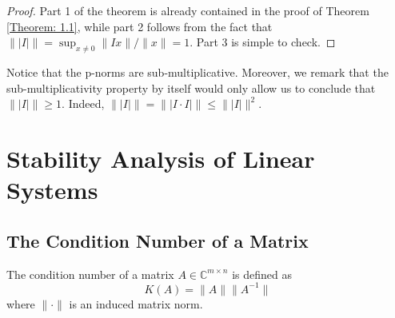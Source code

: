\begin{proof}
    Part 1 of the theorem is already contained in the proof of Theorem \ref{Theorem: 1.1}, while part 2 follows from the fact that $ \||I|\| = \sup_{x \neq 0}{\|Ix\| / \|x\|} = 1 $. Part 3 is simple to check. 
\end{proof}

Notice that the p-norms are sub-multiplicative. Moreover, we remark that the sub-multiplicativity property by itself would only allow us to conclude that $\||I|\| \geq 1$. Indeed, $\||I|\| = \||I \cdot I|\| \leq \||I|\|^2$.

\section{Stability Analysis of Linear Systems}

\subsection{The Condition Number of a Matrix}

The condition number of a matrix $A \in \mathbb{C}^{m \times n}$ is defined as
\begin{equation}
    K(A) = \|A\| \|A^{-1}\|
    \label{Eq: (3.4)}
\end{equation}
where $\|\cdot\|$ is an induced matrix norm. 